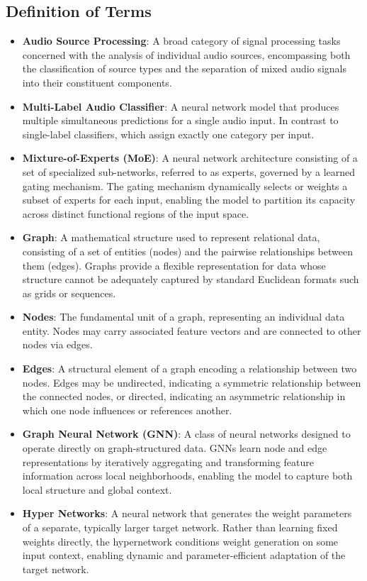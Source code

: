 \documentclass{article}
\begin{document}
\subsection{Definition of Terms}
\begin{itemize}
    \item \textbf{Audio Source Processing}: A broad category of signal processing tasks concerned with the analysis of individual audio sources, encompassing both the classification of source types and the separation of mixed audio signals into their constituent components.
    \item \textbf{Multi-Label Audio Classifier}: A neural network model that produces multiple simultaneous predictions for a single audio input. In contrast to single-label classifiers, which assign exactly one category per input.
    \item \textbf{Mixture-of-Experts (MoE)}: A neural network architecture consisting of a set of specialized sub-networks, referred to as experts, governed by a learned gating mechanism. The gating mechanism dynamically selects or weights a subset of experts for each input, enabling the model to partition its capacity across distinct functional regions of the input space.
    \item \textbf{Graph}: A mathematical structure used to represent relational data, consisting of a set of entities (nodes) and the pairwise relationships between them (edges). Graphs provide a flexible representation for data whose structure cannot be adequately captured by standard Euclidean formats such as grids or sequences.
    \item \textbf{Nodes}:  The fundamental unit of a graph, representing an individual data entity. Nodes may carry associated feature vectors and are connected to other nodes via edges.
    \item \textbf{Edges}:  A structural element of a graph encoding a relationship between two nodes. Edges may be undirected, indicating a symmetric relationship between the connected nodes, or directed, indicating an asymmetric relationship in which one node influences or references another.
    \item \textbf{Graph Neural Network (GNN)}: A class of neural networks designed to operate directly on graph-structured data. GNNs learn node and edge representations by iteratively aggregating and transforming feature information across local neighborhoods, enabling the model to capture both local structure and global context.
    \item \textbf{Hyper Networks}: A neural network that generates the weight parameters of a separate, typically larger target network. Rather than learning fixed weights directly, the hypernetwork conditions weight generation on some input context, enabling dynamic and parameter-efficient adaptation of the target network.

\end{itemize}
\end{document}
